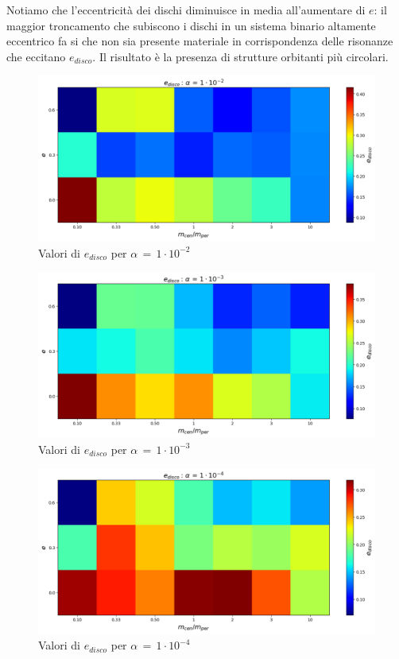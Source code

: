 Notiamo che l'eccentricità dei dischi diminuisce in media all'aumentare di $e$: il maggior troncamento che subiscono i dischi in un sistema binario altamente eccentrico fa si che non sia presente materiale in corrispondenza delle risonanze che eccitano $e_{disco}$. Il risultato è la presenza di strutture orbitanti più circolari.

\begin{figure}[H]
  \centering
  \includegraphics[width=\textwidth]{Immagini/Risultati/edisco_alfa2.png}
  \caption{Valori di $e_{disco}$ per $\alpha\,=\,1\cdot 10^{-2}$}
  \label{fig:edisco_alfa2}
\end{figure}

\begin{figure}[H]
  \centering
  \includegraphics[width=\textwidth]{Immagini/Risultati/edisco_alfa3.png}
  \caption{Valori di $e_{disco}$ per $\alpha\,=\,1\cdot 10^{-3}$}
  \label{fig:edisco_alfa3}
\end{figure}

\begin{figure}[H]
  \centering
  \includegraphics[width=\textwidth]{Immagini/Risultati/edisco_alfa4.png}
  \caption{Valori di $e_{disco}$ per $\alpha\,=\,1\cdot 10^{-4}$}
  \label{fig:edisco:alfa4}
\end{figure}

